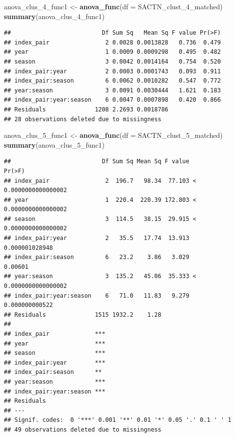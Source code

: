 \documentclass[10pt,A4,]{article}
\newenvironment{Shaded}{\begin{snugshade}}{\end{snugshade}}
\newcommand{\KeywordTok}[1]{\textcolor[rgb]{0.13,0.29,0.53}{\textbf{#1}}}
\newcommand{\DataTypeTok}[1]{\textcolor[rgb]{0.13,0.29,0.53}{#1}}
\newcommand{\StringTok}[1]{\textcolor[rgb]{0.31,0.60,0.02}{#1}}
\newcommand{\NormalTok}[1]{#1}
\begin{document}
\begin{Shaded}
\begin{Highlighting}[]
\NormalTok{anova_clus_4_func1 <-}\StringTok{ }\KeywordTok{anova_func}\NormalTok{(}\DataTypeTok{df =}\NormalTok{ SACTN_clust_4_matched)}
\KeywordTok{summary}\NormalTok{(anova_clus_4_func1)}
\end{Highlighting}
\end{Shaded}

\begin{verbatim}
##                          Df Sum Sq   Mean Sq F value Pr(>F)
## index_pair                2 0.0028 0.0013828   0.736  0.479
## year                      1 0.0009 0.0009298   0.495  0.482
## season                    3 0.0042 0.0014164   0.754  0.520
## index_pair:year           2 0.0003 0.0001743   0.093  0.911
## index_pair:season         6 0.0062 0.0010282   0.547  0.772
## year:season               3 0.0091 0.0030444   1.621  0.183
## index_pair:year:season    6 0.0047 0.0007898   0.420  0.866
## Residuals              1208 2.2693 0.0018786               
## 28 observations deleted due to missingness
\end{verbatim}

\begin{Shaded}
\begin{Highlighting}[]
\NormalTok{anova_clus_5_func1 <-}\StringTok{ }\KeywordTok{anova_func}\NormalTok{(}\DataTypeTok{df =}\NormalTok{ SACTN_clust_5_matched)}
\KeywordTok{summary}\NormalTok{(anova_clus_5_func1)}
\end{Highlighting}
\end{Shaded}

\begin{verbatim}
##                          Df Sum Sq Mean Sq F value               Pr(>F)
## index_pair                2  196.7   98.34  77.103 < 0.0000000000000002
## year                      1  220.4  220.39 172.803 < 0.0000000000000002
## season                    3  114.5   38.15  29.915 < 0.0000000000000002
## index_pair:year           2   35.5   17.74  13.913       0.000001028948
## index_pair:season         6   23.2    3.86   3.029              0.00601
## year:season               3  135.2   45.06  35.333 < 0.0000000000000002
## index_pair:year:season    6   71.0   11.83   9.279       0.000000000522
## Residuals              1515 1932.2    1.28                             
##                           
## index_pair             ***
## year                   ***
## season                 ***
## index_pair:year        ***
## index_pair:season      ** 
## year:season            ***
## index_pair:year:season ***
## Residuals                 
## ---
## Signif. codes:  0 '***' 0.001 '**' 0.01 '*' 0.05 '.' 0.1 ' ' 1
## 49 observations deleted due to missingness
\end{verbatim}
\end{document}
